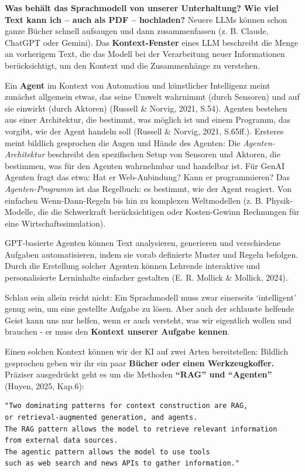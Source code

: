 \documentclass[
  ngerman,
  letterpaper,
  DIV=11]{scrreprt}
\begin{document}
\textbf{Was behält das Sprachmodell von unserer Unterhaltung? Wie viel
Text kann ich -- auch als PDF -- hochladen?} Neuere LLMs können schon
ganze Bücher schnell aufsaugen und dann zusammenfassen (z. B. Claude,
ChatGPT oder Gemini). Das \textbf{Kontext-Fenster} eines LLM beschreibt
die Menge an vorherigem Text, die das Modell bei der Verarbeitung neuer
Informationen berücksichtigt, um den Kontext und die Zusammenhänge zu
verstehen.

Ein \textbf{Agent} im Kontext von Automation und künstlicher Intelligenz
meint zunächst allgemein etwas, das seine Umwelt wahrnimmt (durch
Sensoren) und auf sie einwirkt (durch Aktoren) (Russell \& Norvig, 2021,
S.54). Agenten bestehen aus einer Architektur, die bestimmt, was möglich
ist und einem Programm, das vorgibt, wie der Agent handeln soll (Russell
\& Norvig, 2021, S.65ff.). Ersteres meint bildlich gesprochen die Augen
und Hände des Agenten: Die \emph{Agenten-Architektur} beschreibt den
spezifischen Setup von Sensoren und Aktoren, die bestimmen, was für den
Agenten wahrnehmbar und handelbar ist. Für GenAI Agenten fragt das etwa:
Hat er Web-Anbindung? Kann er programmieren? Das \emph{Agenten-Programm}
ist das Regelbuch: es bestimmt, wie der Agent reagiert. Von einfachen
Wenn-Dann-Regeln bis hin zu komplexen Weltmodellen (z. B.
Physik-Modelle, die die Schwerkraft berücksichtigen oder Kosten-Gewinn
Rechnungen für eine Wirtschaftssimulation).

GPT-basierte Agenten können Text analysieren, generieren und
verschiedene Aufgaben automatisieren, indem sie vorab definierte Muster
und Regeln befolgen. Durch die Erstellung solcher Agenten können
Lehrende interaktive und personalisierte Lerninhalte einfacher gestalten
(E. R. Mollick \& Mollick, 2024).

Schlau sein allein reicht nicht: Ein Sprachmodell muss zwar einerseits
`intelligent' genug sein, um eine gestellte Aufgabe zu lösen. Aber auch
der schlauste helfende Geist kann uns nur helfen, wenn er auch versteht,
was wir eigentlich wollen und brauchen - er muss den \textbf{Kontext
unserer Aufgabe kennen}.

Einen solchen Kontext können wir der KI auf zwei Arten bereitstellen:
Bildlich gesprochen geben wir ihr ein paar \textbf{Bücher oder einen
Werkzeugkoffer.} Präziser ausgedrückt geht es um die Methoden
\textbf{``RAG'' und ``Agenten''} (Huyen, 2025, Kap.6):

\begin{verbatim}
"Two dominating patterns for context construction are RAG, 
or retrieval-augmented generation, and agents. 
The RAG pattern allows the model to retrieve relevant information
from external data sources. 
The agentic pattern allows the model to use tools
such as web search and news APIs to gather information."
\end{verbatim}
\end{document}
